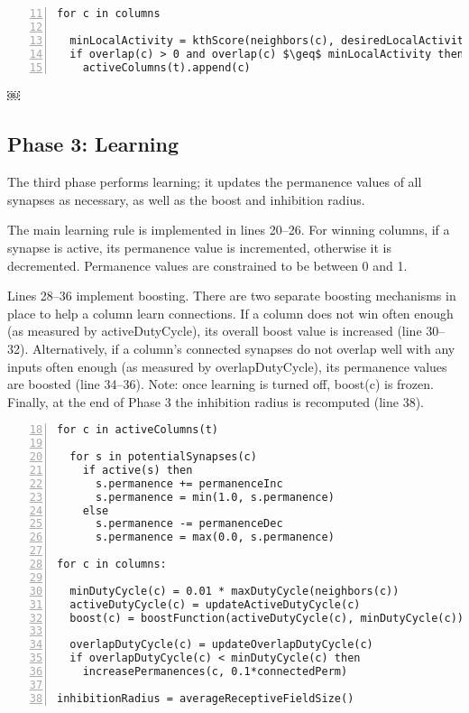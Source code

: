\documentclass{report}
\begin{document}
\begin{lstlisting}[numbers=left,firstnumber=11,mathescape]
for c in columns

  minLocalActivity = kthScore(neighbors(c), desiredLocalActivity)
  if overlap(c) > 0 and overlap(c) $\geq$ minLocalActivity then
    activeColumns(t).append(c)

\end{lstlisting}￼

\subsection*{Phase 3: Learning}
The third phase performs learning; it updates the permanence values of
all synapses as necessary, as well as the boost and inhibition radius.

The main learning rule is implemented in lines 20--26. For winning
columns, if a synapse is active, its permanence value is incremented,
otherwise it is decremented. Permanence values are constrained to be
between 0 and 1.

Lines 28--36 implement boosting. There are two separate boosting
mechanisms in place to help a column learn connections. If a column
does not win often enough (as measured by activeDutyCycle), its
overall boost value is increased (line 30--32). Alternatively, if a
column's connected synapses do not overlap well with any inputs often
enough (as measured by overlapDutyCycle), its permanence values are
boosted (line 34--36). Note: once learning is turned off, boost(c) is
frozen.  Finally, at the end of Phase 3 the inhibition radius is
recomputed (line 38).

\begin{lstlisting}[numbers=left,firstnumber=18]
for c in activeColumns(t)

  for s in potentialSynapses(c)
    if active(s) then
      s.permanence += permanenceInc
      s.permanence = min(1.0, s.permanence)
    else
      s.permanence -= permanenceDec
      s.permanence = max(0.0, s.permanence)

for c in columns:

  minDutyCycle(c) = 0.01 * maxDutyCycle(neighbors(c))
  activeDutyCycle(c) = updateActiveDutyCycle(c)
  boost(c) = boostFunction(activeDutyCycle(c), minDutyCycle(c))

  overlapDutyCycle(c) = updateOverlapDutyCycle(c)
  if overlapDutyCycle(c) < minDutyCycle(c) then
    increasePermanences(c, 0.1*connectedPerm)

inhibitionRadius = averageReceptiveFieldSize()

\end{lstlisting}
\end{document}
